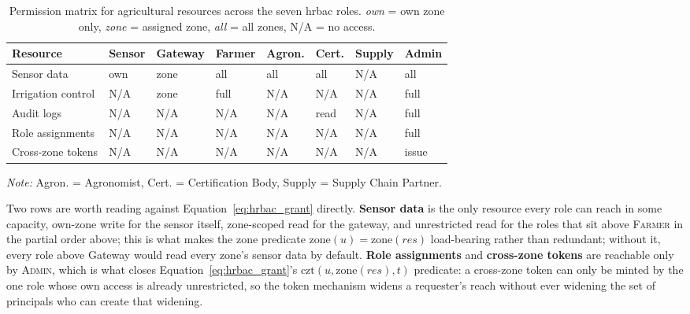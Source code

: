 \begin{table}[htbp]
\centering
\caption{Permission matrix for agricultural resources across the seven
         \gls{hrbac} roles. \emph{own} = own zone only, \emph{zone} =
         assigned zone, \emph{all} = all zones, N/A = no access.}
\label{tab:app-hrbac-matrix}
\footnotesize
\begin{tabularx}{\textwidth}{@{}p{}X X X X X X X@{}}
\toprule
\textbf{Resource} & \textbf{Sensor} & \textbf{Gateway} & \textbf{Farmer} &
  \textbf{Agron.} & \textbf{Cert.} & \textbf{Supply} & \textbf{Admin} \\
\midrule
Sensor data        & own & zone & all  & all & all  & N/A   & all \\
Irrigation control  & N/A & zone & full & N/A & N/A  & N/A   & full \\
Audit logs          & N/A & N/A  & N/A  & N/A & read & N/A   & full \\
Role assignments    & N/A & N/A  & N/A  & N/A & N/A  & N/A   & full \\
Cross-zone tokens   & N/A & N/A  & N/A  & N/A & N/A  & N/A   & issue \\
\bottomrule
\end{tabularx}
{\footnotesize \textit{Note:} Agron. = Agronomist, Cert. = Certification
 Body, Supply = Supply Chain Partner.}
\end{table}

Two rows are worth reading against Equation~\ref{eq:hrbac_grant} directly.
\textbf{Sensor data} is the only resource every role can reach in some
capacity, own-zone write for the sensor itself, zone-scoped read for the
gateway, and unrestricted read for the roles that sit above \textsc{Farmer}
in the partial order above; this is what makes the zone predicate
$\mathrm{zone}(u) = \mathrm{zone}(res)$ load-bearing rather than redundant;
without it, every role above Gateway would read every zone's sensor data
by default. \textbf{Role assignments} and \textbf{cross-zone tokens} are
reachable only by \textsc{Admin}, which is what closes
Equation~\ref{eq:hrbac_grant}'s $\mathrm{czt}(u,\mathrm{zone}(res),t)$
predicate: a cross-zone token can only be minted by the one role whose own
access is already unrestricted, so the token mechanism widens a
requester's reach without ever widening the set of principals who can
create that widening.

